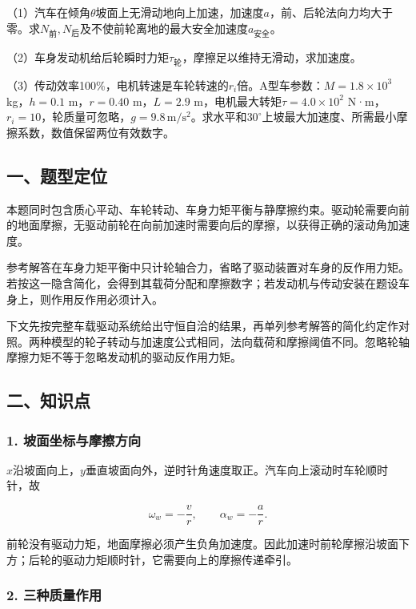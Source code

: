 \documentclass[12pt,a4paper,fontset=fandol]{ctexart}
\begin{document}
（1）汽车在倾角\(\theta\)坡面上无滑动地向上加速，加速度\(a\)，前、后轮法向力均大于零。求\(N_{\text{前}},N_{\text{后}}\)及不使前轮离地的最大安全加速度\(a_{\text{安全}}\)。

（2）车身发动机给后轮瞬时力矩\(\tau_{\text{轮}}\)，摩擦足以维持无滑动，求加速度。

（3）传动效率100\%，电机转速是车轮转速的\(r_i\)倍。A型车参数：\(M=1.8\times10^3\)
kg，\(h=0.1\) m，\(r=0.40\) m，\(L=2.9\)
m，电机最大转矩\(\tau=4.0\times10^2\)
N·m，\(r_i=10\)，轮质量可忽略，\(g=9.8\,\mathrm{m/s^2}\)。求水平和\(30^\circ\)上坡最大加速度、所需最小摩擦系数，数值保留两位有效数字。

\subsection{一、题型定位}\label{ux4e00ux9898ux578bux5b9aux4f4d-6}

本题同时包含质心平动、车轮转动、车身力矩平衡与静摩擦约束。驱动轮需要向前的地面摩擦，无驱动前轮在向前加速时需要向后的摩擦，以获得正确的滚动角加速度。

参考解答在车身力矩平衡中只计轮轴合力，省略了驱动装置对车身的反作用力矩。若按这一隐含简化，会得到其载荷分配和摩擦数字；若发动机与传动安装在题设车身上，则作用反作用必须计入。

下文先按完整车载驱动系统给出守恒自洽的结果，再单列参考解答的简化约定作对照。两种模型的轮子转动与加速度公式相同，法向载荷和摩擦阈值不同。忽略轮轴摩擦力矩不等于忽略发动机的驱动反作用力矩。

\subsection{二、知识点}\label{ux4e8cux77e5ux8bc6ux70b9-6}

\subsubsection{1.
坡面坐标与摩擦方向}\label{ux5761ux9762ux5750ux6807ux4e0eux6469ux64e6ux65b9ux5411}

\(x\)沿坡面向上，\(y\)垂直坡面向外，逆时针角速度取正。汽车向上滚动时车轮顺时针，故

\[
\omega_w=-\frac vr,\qquad
\alpha_w=-\frac ar.
\]

前轮没有驱动力矩，地面摩擦必须产生负角加速度。因此加速时前轮摩擦沿坡面下方；后轮的驱动力矩顺时针，它需要向上的摩擦传递牵引。

\subsubsection{2.
三种质量作用}\label{ux4e09ux79cdux8d28ux91cfux4f5cux7528}
\end{document}
